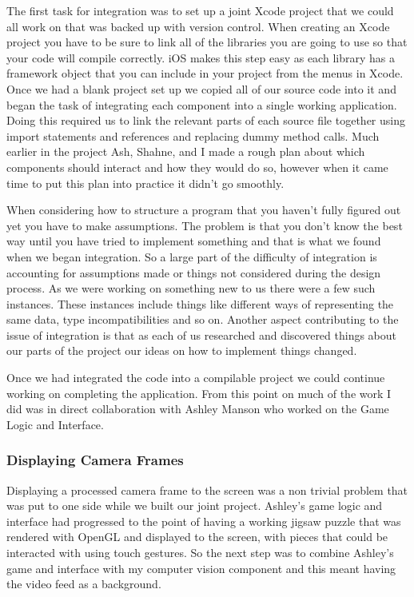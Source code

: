 \documentclass{article}
\begin{document}
The first task for integration was to set up a joint Xcode project that we could all work on that was backed up with version control. When creating an Xcode project you have to be sure to link all of the libraries you are going to use so that your code will compile correctly. iOS makes this step easy as each library has a framework object that you can include in your project from the menus in Xcode. Once we had a blank project set up we copied all of our source code into it and began the task of integrating each component into a single working application. Doing this required us to link the relevant parts of each source file together using import statements and references and replacing dummy method calls. Much earlier in the project Ash, Shahne, and I made a rough plan about which components should interact and how they would do so, however when it came time to put this plan into practice it didn't go smoothly. 

When considering how to structure a program that you haven't fully figured out yet you have to make assumptions. The problem is that you don't know the best way until you have tried to implement something and that is what we found when we began integration. So a large part of the difficulty of integration is accounting for assumptions made or things not considered during the design process. As we were working on something new to us there were a few such instances. These instances include things like different ways of representing the same data, type incompatibilities and so on. Another aspect contributing to the issue of integration is that as each of us researched and discovered things about our parts of the project our ideas on how to implement things changed.

Once we had integrated the code into a compilable project we could continue working on completing the application. From this point on much of the work I did was in direct collaboration with Ashley Manson who worked on the Game Logic and Interface. 

\subsubsection{Displaying Camera Frames}

Displaying a processed camera frame to the screen was a non trivial problem that was put to one side while we built our joint project. Ashley's game logic and interface had progressed to the point of having a working jigsaw puzzle that was rendered with OpenGL and displayed to the screen, with pieces that could be interacted with using touch gestures. So the next step was to combine Ashley's game and interface with my computer vision component and this meant having the video feed as a background. 
\end{document}
